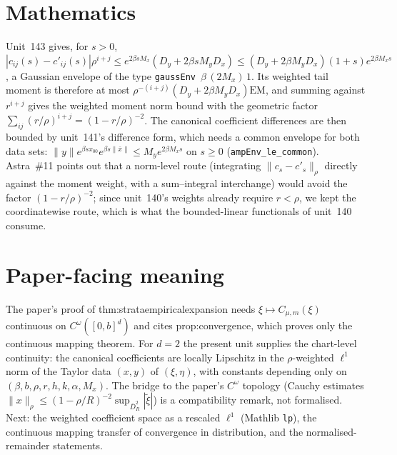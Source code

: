 \documentclass[11pt]{article}
\begin{document}
\section{Mathematics}
Unit~143 gives, for $s>0$, $|c_{ij}(s)-c'_{ij}(s)|\rho^{i+j}\le e^{2\beta sM_x}(D_y+2\beta sM_yD_x)
\le(D_y+2\beta M_yD_x)(1+s)e^{2\beta M_xs}$, a Gaussian envelope of the type
\texttt{gaussEnv}~$\beta\,(2M_x)\,1$. Its weighted tail moment is therefore at most
$\rho^{-(i+j)}(D_y+2\beta M_yD_x)\mathrm{EM}$, and summing against $r^{i+j}$ gives the weighted
moment norm bound with the geometric factor $\sum_{ij}(r/\rho)^{i+j}=(1-r/\rho)^{-2}$. The
canonical coefficient differences are then bounded by unit~141's difference form, which needs a
common envelope for both data sets: $\|y\|e^{\beta sx_{00}}e^{\beta s\|\bar x\|}\le M_ye^{2\beta M_xs}$
on $s\ge0$ (\texttt{ampEnv\_le\_common}). Astra~\#11 points out that a norm-level route (integrating
$\|c_s-c'_s\|_\rho$ directly against the moment weight, with a sum--integral interchange) would avoid
the factor $(1-r/\rho)^{-2}$; since unit~140's weights already require $r<\rho$, we kept the
coordinatewise route, which is what the bounded-linear functionals of unit~140 consume.

\section{Paper-facing meaning}
The paper's proof of thm:strataempiricalexpansion needs $\xi\mapsto C_{\mu,m}(\xi)$ continuous on
$C^\omega([0,b]^d)$ and cites prop:convergence, which proves only the continuous mapping theorem.
For $d=2$ the present unit supplies the chart-level continuity: the canonical coefficients are
locally Lipschitz in the $\rho$-weighted $\ell^1$ norm of the Taylor data $(x,y)$ of $(\xi,\eta)$,
with constants depending only on $(\beta,b,\rho,r,h,k,\alpha,M_x)$. The bridge to the paper's
$C^\omega$ topology (Cauchy estimates $\|x\|_\rho\le(1-\rho/R)^{-2}\sup_{\bar D_R^2}|\tilde\xi|$) is a
compatibility remark, not formalised. Next: the weighted coefficient space as a rescaled $\ell^1$
(Mathlib \texttt{lp}), the continuous mapping transfer of convergence in distribution, and the
normalised-remainder statements.
\end{document}
